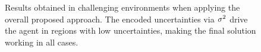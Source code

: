 \begin{figure}[!t]
	\begin{center}
		\begin{minipage}{.45\linewidth}
			\centering
		\end{minipage}
		\begin{minipage}{.45\linewidth}
			\centering
		\end{minipage}
	\end{center}
	\caption{Results obtained in challenging environments when applying the overall proposed approach.
    The encoded uncertainties via $\sigma^2$ drive the agent in regions with low uncertainties, making the final solution
    working in all cases.}%
    \label{FIG:CBF-RESULTS-WIN}
\end{figure}
